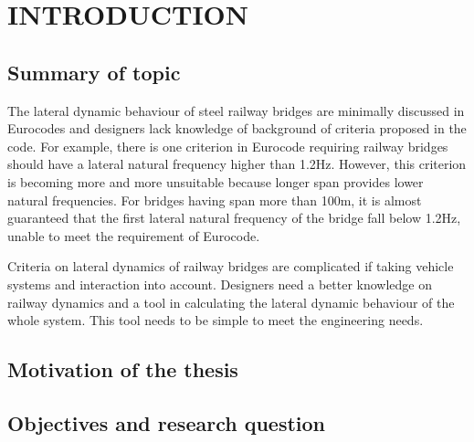 
\chapter{INTRODUCTION}

\section{Summary of topic}

The lateral dynamic behaviour of steel railway bridges are minimally discussed in Eurocodes and designers lack knowledge of background of criteria proposed in the code. For example, there is one criterion in Eurocode requiring railway bridges should have a lateral natural frequency higher than 1.2Hz. However, this criterion is becoming more and more unsuitable because longer span provides lower natural frequencies. For bridges having span more than 100m, it is almost guaranteed that the first lateral natural frequency of the bridge fall below 1.2Hz, unable to meet the requirement of Eurocode. 

Criteria on lateral dynamics of railway bridges are complicated if taking vehicle systems and interaction into account. Designers need a better knowledge on railway dynamics and a tool in calculating the lateral dynamic behaviour of the whole system. This tool needs to be simple to meet the engineering needs.  

\section{Motivation of the thesis}


\section{Objectives and research question}\label{sec:introduction}




